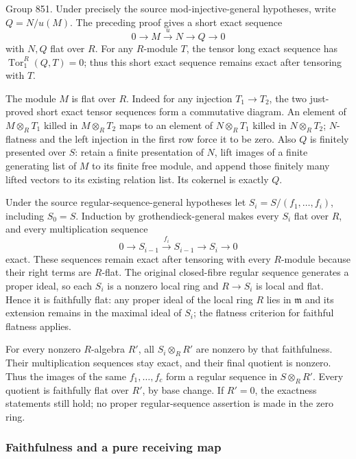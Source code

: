 Group 851. Under precisely the source mod-injective-general hypotheses, write \(Q=N/u(M)\). The preceding proof gives a short exact sequence \[
0\longrightarrow M\xrightarrow{u}N\longrightarrow Q\longrightarrow0
\] with \(N,Q\) flat over \(R\). For any \(R\)-module \(T\), the tensor long exact sequence has \(\operatorname{Tor}_1^R(Q,T)=0\); thus this short exact sequence remains exact after tensoring with \(T\).

The module \(M\) is flat over \(R\). Indeed for any injection \(T_1\to T_2\), the two just-proved short exact tensor sequences form a commutative diagram. An element of \(M\otimes_R T_1\) killed in \(M\otimes_R T_2\) maps to an element of \(N\otimes_R T_1\) killed in \(N\otimes_R T_2\); \(N\)-flatness and the left injection in the first row force it to be zero. Also \(Q\) is finitely presented over \(S\): retain a finite presentation of \(N\), lift images of a finite generating list of \(M\) to its finite free module, and append those finitely many lifted vectors to its existing relation list. Its cokernel is exactly \(Q\).

Under the source regular-sequence-general hypotheses let \(S_i=S/(f_1,\ldots,f_i)\), including \(S_0=S\). Induction by grothendieck-general makes every \(S_i\) flat over \(R\), and every multiplication sequence \[
0\longrightarrow S_{i-1}\xrightarrow{f_i}S_{i-1}
\longrightarrow S_i\longrightarrow0
\] exact. These sequences remain exact after tensoring with every \(R\)-module because their right terms are \(R\)-flat. The original closed-fibre regular sequence generates a proper ideal, so each \(S_i\) is a nonzero local ring and \(R\to S_i\) is local and flat. Hence it is faithfully flat: any proper ideal of the local ring \(R\) lies in \(\mathfrak m\) and its extension remains in the maximal ideal of \(S_i\); the flatness criterion for faithful flatness applies.

For every nonzero \(R\)-algebra \(R'\), all \(S_i\otimes_R R'\) are nonzero by that faithfulness. Their multiplication sequences stay exact, and their final quotient is nonzero. Thus the images of the same \(f_1,\ldots,f_c\) form a regular sequence in \(S\otimes_R R'\). Every quotient is faithfully flat over \(R'\), by base change. If \(R'=0\), the exactness statements still hold; no proper regular-sequence assertion is made in the zero ring.

\subsubsection{Faithfulness and a pure receiving map}\label{faithfulness-and-a-pure-receiving-map}


